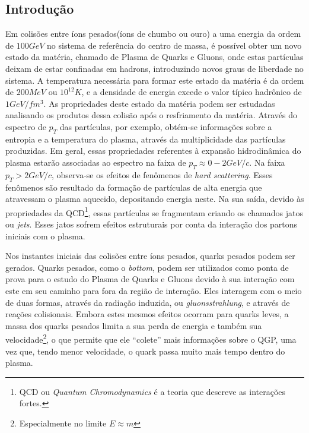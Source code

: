 \subsection{Introdução}

Em colisões entre íons pesados(íons de chumbo ou ouro) a uma energia da ordem de $100 GeV$ no sistema de referência do centro de massa, é possível obter um novo estado da matéria, chamado de Plasma de Quarks e Gluons, onde estas partículas deixam
de estar confinadas em hadrons, introduzindo novos graus de liberdade no sistema. A temperatura necessária para formar este estado da
matéria é da ordem  de $200 MeV$\cite{letessier_hadrons_2002} ou $10^{12} K$, e a densidade de energia excede o valor típico hadrônico de
$1 GeV/fm^{3}$. As propriedades deste estado da matéria podem ser estudadas analisando os produtos dessa colisão após o resfriamento da
matéria. Através do espectro de $p_T$ das partículas, por exemplo, obtém-se informações sobre a
entropia e a temperatura do plasma, através da multiplicidade das partículas produzidas\cite{letessier_hadrons_2002}.
Em geral, essas propriedades referentes à expansão hidrodinâmica do plasma estarão associadas
ao espectro na faixa de $p_T \approx 0-2 GeV/c$. Na faixa $p_T > 2 GeV/c$, observa-se os efeitos de fenômenos de {\it hard
scattering}. Esses fenômenos são resultado da formação de partículas de alta energia que atravessam o plasma aquecido, depositando
energia neste. Na sua saída, devido às propriedades\cite{skands_introduction_2013} da QCD\footnote{QCD ou {\it Quantum Chromodynamics}
é a teoria que descreve as interações fortes.}, essas partículas se fragmentam criando os chamados jatos ou {\it jets}. Esses jatos sofrem efeitos estruturais por conta da interação dos partons
iniciais\cite{lokhtin_angular_1998,bass_systematic_2009,connors_review_2017,nattrass_jet_2018,denterria_jet_2009} com o plasma.

%

Nos instantes iniciais das colisões entre íons pesados, quarks pesados podem ser gerados. Quarks pesados, como o \emph{bottom}, podem ser utilizados como ponta de prova para o estudo do Plasma de Quarks e Gluons
devido à sua interação com este em seu caminho para fora da região de interação\cite{li_inverting_2017,renk_jet_2014}. Eles
interagem com o meio de duas formas, através da radiação induzida, ou \emph{gluonsstrahlung}, e através de reações colisionais.
Embora estes mesmos efeitos ocorram para quarks leves, a massa dos quarks pesados limita a sua perda de energia e também sua
velocidade\footnote{Especialmente no limite $E \approx m$}, o que permite que ele ``colete'' mais informações sobre o QGP,
uma vez que, tendo menor velocidade, o quark passa muito mais tempo dentro do plasma\cite{renk_jet_2014}.

